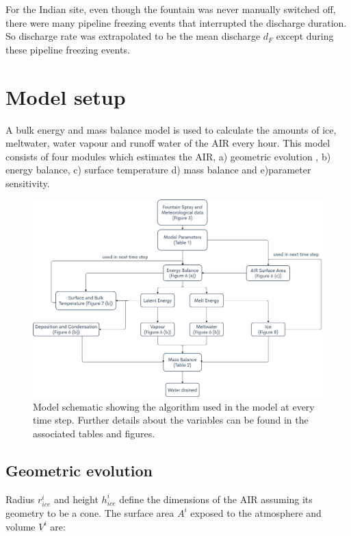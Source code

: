 \documentclass[utf8]{frontiersSCNS} %
\begin{document}
For the Indian site, even though the fountain was never manually switched off, there were many pipeline freezing events that
interrupted the discharge duration. So discharge rate was extrapolated to be the mean discharge $d_F$ except during
these pipeline freezing events.

\section{Model setup}

A bulk energy and mass balance model is used to calculate the amounts of ice, meltwater, water vapour and runoff water
of the AIR every hour. This model consists of four modules which estimates the AIR, a) geometric evolution , b) energy
balance, c) surface temperature d) mass balance and e)parameter sensitivity.

\begin{figure} \begin{center} \includegraphics[width=15 cm]{Figures/Figure_4.jpg} \end{center} \caption{Model
		schematic showing the algorithm used in the model at every time step. Further details about the variables can be
		found in the associated tables and figures.} \label{fig:schema} \end{figure}

\subsection{Geometric evolution}

Radius $r_{ice}^i$ and height $h_{ice}^i$ define the dimensions of the AIR assuming its geometry to be a cone. The
surface area $A^i$ exposed to the atmosphere and volume $V^i$ are:
\end{document}
